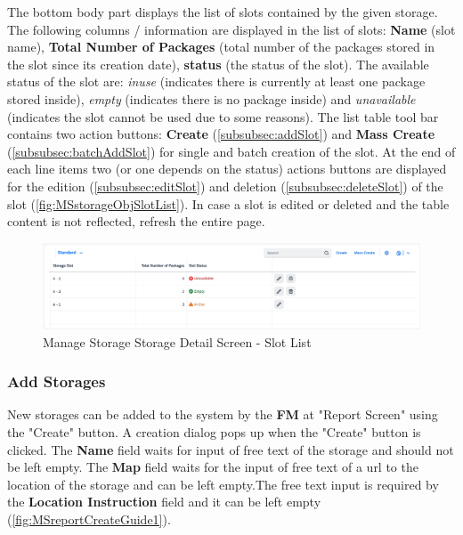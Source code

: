 The bottom body part displays the list of slots contained by the given storage. 
The following columns / information are displayed in the list of slots: \textbf{Name} (slot name), \textbf{Total Number of Packages} (total number of the packages stored in the slot since its creation date), \textbf{status} (the status of the slot). The available status of the slot are: \textit{inuse} (indicates there is currently at least one package stored inside), \textit{empty} (indicates there is no package inside) and \textit{unavailable} (indicates the slot cannot be used due to some reasons).
The list table tool bar contains two action buttons: \textbf{Create} (\autoref{subsubsec:addSlot}) and \textbf{Mass Create} (\autoref{subsubsec:batchAddSlot}) for single and batch creation of the slot. 
At the end of each line items two (or one depends on the status) actions buttons are displayed for the edition (\autoref{subsubsec:editSlot}) and deletion (\autoref{subsubsec:deleteSlot}) of the slot (\autoref{fig:MSstorageObjSlotList}).
In case a slot is edited or deleted and the table content is not reflected, refresh the entire page.

\begin{figure}[H] %
	\centering
	\includegraphics[width=1\linewidth]{images/user_doc/storage/updatedSlotEditDelete/StorageObjectSlotTable.png}
	\caption{Manage Storage Storage Detail Screen - Slot List}
	\label{fig:MSstorageObjSlotList}
\end{figure}

\bigskip

\subsubsection{Add Storages}

New storages can be added to the system by the \textbf{FM} at "Report Screen" using the "Create" button.
A creation dialog pops up when the "Create" button is clicked. The \textbf{Name} field waits for input of free text of the storage and should not be left empty. The \textbf{Map} field waits for the input of free text of a url to the location of the storage and can be left empty.The free text input is required by the \textbf{Location Instruction} field and it can be left empty (\autoref{fig:MSreportCreateGuide1}).

